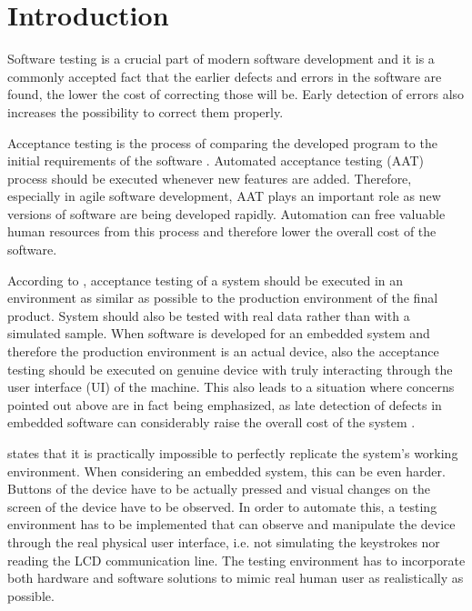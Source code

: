 
\chapter{Introduction}
\label{chapter:intro}

Software testing is a crucial part of modern software development and it is a commonly accepted fact that the earlier defects and errors in the software are found, the lower the cost of correcting those will be. Early detection of errors also increases the possibility to correct them properly. \citep{myers2011art}

Acceptance testing is the process of comparing the developed program to the initial requirements of the software \citep{myers2011art}. Automated acceptance testing (AAT) process should be executed whenever new features are added. Therefore, especially in agile software development, AAT plays an important role as new versions of software are being developed rapidly. Automation can free valuable human resources from this process \citep{haugset2008automated} and therefore lower the overall cost of the software.

According to \cite{sommerville2011software}, acceptance testing of a system should be executed in an environment as similar as possible to the production environment of the final product. System should also be tested with real data rather than with a simulated sample. When software is developed for an embedded system and therefore the production environment is an actual device, also the acceptance testing should be executed on genuine device with truly interacting through the user interface (UI) of the machine. This also leads to a situation where concerns pointed out above are in fact being emphasized, as late detection of defects in embedded software can considerably raise the overall cost of the system \citep{ebert2009embedded}.

\cite{sommerville2011software} states that it is practically impossible to perfectly replicate the system's working environment. When considering an embedded system, this can be even harder. Buttons of the device have to be actually pressed and visual changes on the screen of the device have to be observed. In order to automate this, a testing environment has to be implemented that can observe and manipulate the device through the real physical user interface, i.e. not simulating the keystrokes nor reading the LCD communication line. The testing environment has to incorporate both hardware and software solutions to mimic real human user as realistically as possible.

